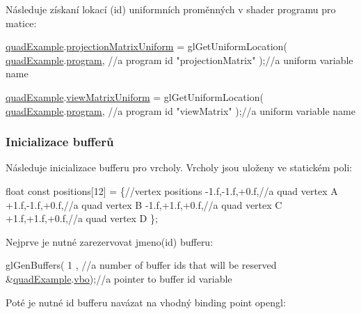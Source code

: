 Následuje získaní lokací (id) uniformních proměnných v shader programu pro matice\-: 
\begin{DoxyCodeInclude}
  \hyperlink{quadExample_8c_ad961415145a9c30bd9846d4a278cc63a}{quadExample}.\hyperlink{structQuadExampleVariables_a38a1023cb8ee3692e195ea574e43c51a}{projectionMatrixUniform} = glGetUniformLocation(
      \hyperlink{quadExample_8c_ad961415145a9c30bd9846d4a278cc63a}{quadExample}.\hyperlink{structQuadExampleVariables_a63971781ff860bd201886926f943ba78}{program}, \textcolor{comment}{//a program id}
      \textcolor{stringliteral}{"projectionMatrix"} );\textcolor{comment}{//a uniform variable name}

  \hyperlink{quadExample_8c_ad961415145a9c30bd9846d4a278cc63a}{quadExample}.\hyperlink{structQuadExampleVariables_a9c505e0a089ecd495b18550309ebab77}{viewMatrixUniform} = glGetUniformLocation(
      \hyperlink{quadExample_8c_ad961415145a9c30bd9846d4a278cc63a}{quadExample}.\hyperlink{structQuadExampleVariables_a63971781ff860bd201886926f943ba78}{program}, \textcolor{comment}{//a program id}
      \textcolor{stringliteral}{"viewMatrix"}       );\textcolor{comment}{//a uniform variable name}
\end{DoxyCodeInclude}
\hypertarget{quadExample.c_Buffers}{}\subsubsection{Inicializace bufferů}\label{quadExample.c_Buffers}
Následuje inicializace bufferu pro vrcholy. Vrcholy jsou uloženy ve statickém poli\-: 
\begin{DoxyCodeInclude}
  \textcolor{keywordtype}{float} \textcolor{keyword}{const} positions[12] = \{\textcolor{comment}{//vertex positions}
    -1.f,-1.f,+0.f,\textcolor{comment}{//a quad vertex A}
    +1.f,-1.f,+0.f,\textcolor{comment}{//a quad vertex B}
    -1.f,+1.f,+0.f,\textcolor{comment}{//a quad vertex C}
    +1.f,+1.f,+0.f,\textcolor{comment}{//a quad vertex D}
  \};
\end{DoxyCodeInclude}
Nejprve je nutné zarezervovat jmeno(id) bufferu\-: 
\begin{DoxyCodeInclude}
  glGenBuffers(
      1               , \textcolor{comment}{//a number of buffer ids that will be reserved}
      &\hyperlink{quadExample_8c_ad961415145a9c30bd9846d4a278cc63a}{quadExample}.\hyperlink{structQuadExampleVariables_a69515fd546272c117e14f784221f6412}{vbo});\textcolor{comment}{//a pointer to buffer id variable}
\end{DoxyCodeInclude}
Poté je nutné id bufferu navázat na vhodný binding point opengl\-: 
